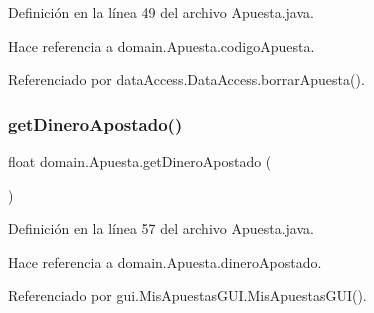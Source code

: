 Definición en la línea 49 del archivo Apuesta.\+java.


\begin{DoxyCode}{0}

\end{DoxyCode}


Hace referencia a domain.\+Apuesta.\+codigo\+Apuesta.



Referenciado por data\+Access.\+Data\+Access.\+borrar\+Apuesta().

\mbox{\label{classdomain_1_1Apuesta_a15f352d9fe3703d744745578a227ad27}} 
\subsubsection{\texorpdfstring{getDineroApostado()}{getDineroApostado()}}
{\footnotesize\ttfamily float domain.\+Apuesta.\+get\+Dinero\+Apostado (\begin{DoxyParamCaption}{ }\end{DoxyParamCaption})}



Definición en la línea 57 del archivo Apuesta.\+java.


\begin{DoxyCode}{0}

\end{DoxyCode}


Hace referencia a domain.\+Apuesta.\+dinero\+Apostado.



Referenciado por gui.\+Mis\+Apuestas\+G\+U\+I.\+Mis\+Apuestas\+G\+U\+I().

\mbox{\label{classdomain_1_1Apuesta_a4ca4ca8fbb35d45d55152bf0aaa9ff0e}} 
